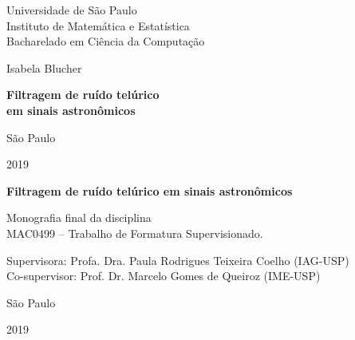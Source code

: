 \documentclass[12pt,twoside,a4paper]{book}
\begin{document}
\frontmatter 
\fancyhead[RO]{{\footnotesize\rightmark}\hspace{2em}\thepage}
\setcounter{tocdepth}{2}
\fancyhead[LE]{\thepage\hspace{2em}\footnotesize{\leftmark}}
\fancyhead[RE,LO]{}
\fancyhead[RO]{{\footnotesize\rightmark}\hspace{2em}\thepage}

\onehalfspacing  %

\thispagestyle{empty}
\begin{center}
    \vspace*{2.3cm}
    Universidade de São Paulo\\
    Instituto de Matemática e Estatística\\
    Bacharelado em Ciência da Computação


    \vspace*{3cm}
    \Large{Isabela Blucher}
    

    \vspace{3cm}
    \textbf{\Large{Filtragem de ruído telúrico \\
    em sinais astronômicos}}
    
       
    \vskip 5cm
    \normalsize{São Paulo}

    \normalsize{2019}
\end{center}

%
\newpage
\thispagestyle{empty}
    \begin{center}
        \vspace*{2.3 cm}
        \textbf{\Large{Filtragem de ruído telúrico em sinais astronômicos}}
        \vspace*{2 cm}
    \end{center}

    \vskip 2cm

    \begin{flushright}
	Monografia final da disciplina \\
        MAC0499 -- Trabalho de Formatura Supervisionado.
    \end{flushright}

    \vskip 5cm

    \begin{center}
    Supervisora: Profa. Dra. Paula Rodrigues Teixeira Coelho (IAG-USP)\\
    Co-supervisor: Prof. Dr. Marcelo Gomes de Queiroz (IME-USP)

    \vskip 5cm
    \normalsize{São Paulo}

    \normalsize{2019}
    \end{center}
\pagebreak
\end{document}
